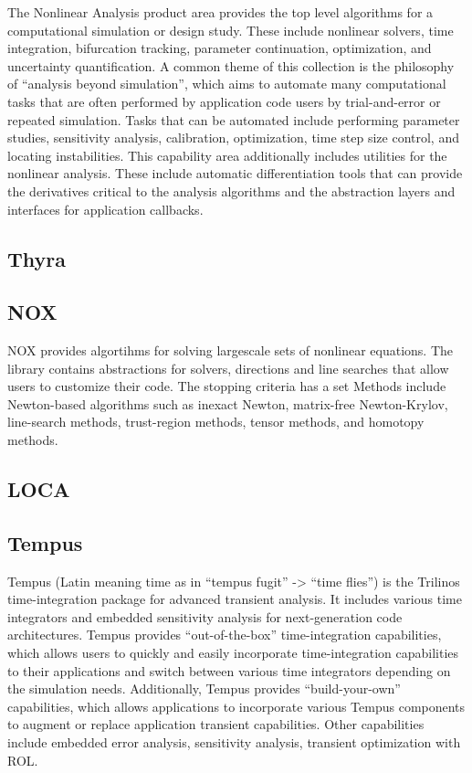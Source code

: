 
The Nonlinear Analysis product area provides the top level algorithms for a computational simulation or design study.
These include nonlinear solvers, time integration, bifurcation tracking, parameter continuation, optimization, and uncertainty quantification.
A common theme of this collection is the philosophy of ``analysis beyond simulation'', which aims to automate many computational tasks that are often performed by application code users by trial-and-error or repeated simulation.
Tasks that can be automated include performing parameter studies, sensitivity analysis, calibration, optimization, time step size control, and locating instabilities.
This capability area additionally includes utilities for the nonlinear analysis. These include automatic differentiation tools that can provide the derivatives critical to the analysis algorithms and the abstraction layers and interfaces for application callbacks.

\subsection{Thyra}

\subsection{NOX}
NOX provides algortihms for solving large\-scale sets of nonlinear equations.
The library contains abstractions for solvers, directions and line searches that allow users to customize their code.
The stopping criteria has a set 
Methods include Newton-based algorithms such as inexact Newton, matrix-free Newton-Krylov, line-search methods, trust-region methods, tensor methods, and homotopy methods.

\subsection{LOCA}

\subsection{Tempus}

Tempus (Latin meaning time as in “tempus fugit” -> “time flies”)
is the Trilinos time-integration package for advanced transient
analysis.  It includes various time integrators and embedded
sensitivity analysis for next-generation code architectures.  Tempus
provides “out-of-the-box” time-integration capabilities, which
allows users to quickly and easily incorporate time-integration
capabilities to their applications and switch between various time
integrators depending on the simulation needs.  Additionally, Tempus
provides “build-your-own” capabilities, which allows applications
to incorporate various Tempus components to augment or replace
application transient capabilities. Other capabilities include
embedded error analysis, sensitivity analysis, transient optimization
with ROL.

